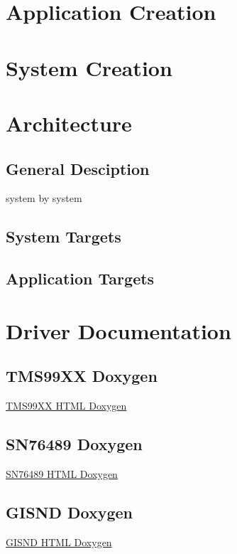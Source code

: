 \documentclass{article}
\begin{document}
  \newpage

  \section{Application Creation}

  \newpage

  \section{System Creation}

  \newpage

  \section{Architecture}
  \subsection{General Desciption}

  \par
  system by system

  \subsection{System Targets}

  \newpage

  \subsection{Application Targets}
  \subs

  \section{Driver Documentation}

  \subsection{TMS99XX Doxygen}
  \href{https://sparkletron.github.io/RODAC/manual/dox/tms99XX/html/index.html}{TMS99XX HTML Doxygen}

  \subsection{SN76489 Doxygen}
  \href{https://sparkletron.github.io/RODAC/manual/dox/sn76489/html/index.html}{SN76489 HTML Doxygen}

  \subsection{GISND Doxygen}
  \href{https://sparkletron.github.io/RODAC/manual/dox/gisnd/html/index.html}{GISND HTML Doxygen}
\end{document}
